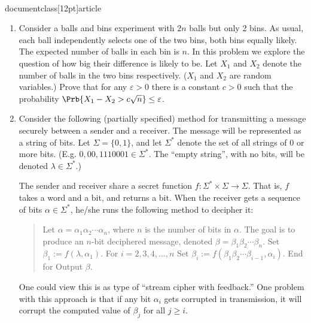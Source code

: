 \\documentclass[12pt]{article}
\begin{document}
\begin{enumerate}
{}


\item
Consider a balls and bins experiment with $2n$ balls but only 2 bins.
As usual, each ball independently selects one of the two bins, both bins
equally likely. The expected
number of balls in each bin is $n$. In this problem we explore the question
of how big their difference is likely to be.
Let $X_1$ and $X_2$ denote the
number of balls in the two bins respectively. ($X_1$ and $X_2$ are random
variables.) Prove that for any $\varepsilon>0$ there is a constant
$c>0$ such that the  probability
$\Prb{X_1-X_2 > c \sqrt{n}} \le \varepsilon$.



\item 

\renewcommand\^[1]{^{\langle#1\rangle}}

Consider the following (partially specified) method
for transmitting a message securely between a sender and a receiver.
The message will be represented as a string of bits.
Let $\Sigma = \{0,1\}$, and let $\Sigma^*$ denote the
set of all strings of $0$ or more bits.
(E.g. $0, 00, 1110001 \in \Sigma^*$.
The ``empty string'', with no bits, will be denoted $\lambda \in \Sigma^*.$)

The sender and receiver share a secret function
$f: \Sigma^* \times \Sigma \rightarrow \Sigma$.
That is, $f$ takes a word and a bit, and returns a bit.
When the receiver gets a sequence of bits
$\alpha \in \Sigma^*$, he/she runs the following
method to decipher it:
\begin{quote}
\begin{code}
Let $\alpha = \alpha_1 \alpha_2 \cdots \alpha_n$, where $n$ is the number of bits in $\alpha$.
The goal is to produce an $n$-bit deciphered message, denoted $\beta = \beta_1 \beta_2 \cdots \beta_n$.
Set $\beta_1 := f(\lambda, \alpha_1).$
For $i = 2, 3, 4, \ldots, n$
  Set $\beta_i := f(\beta_1 \beta_2 \cdots \beta_{i-1}, \alpha_i)$.
  End for
Output $\beta$.
\end{code}
\end{quote}
One could view this is as type of ``stream cipher with feedback.''
One problem with this approach is that if any bit $\alpha_i$
gets corrupted in transmission, it will corrupt the computed
value of $\beta_j$ for all $j \geq i$.


\end{enumerate}
\end{document}
